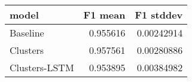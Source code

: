 \begin{tabular}{lrr}
\toprule
 model         &   F1 mean &   F1 stddev \\
\midrule
 Baseline      &  0.955616 &  0.00242914 \\
 Clusters      &  0.957561 &  0.00280886 \\
 Clusters-LSTM &  0.953895 &  0.00384982 \\
\bottomrule
\end{tabular}